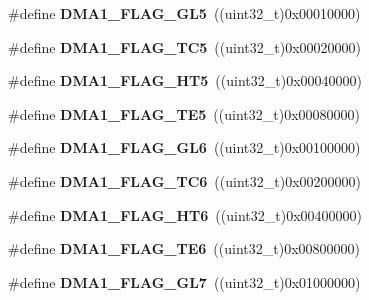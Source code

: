 \begin{DoxyCompactItemize}
\item 
\hypertarget{group__DMA__flags__definition_ga173d8dadcbf3d96911a43eedf53bd64e}{
\#define {\bfseries DMA1\_\-FLAG\_\-GL5}~((uint32\_\-t)0x00010000)}
\label{group__DMA__flags__definition_ga173d8dadcbf3d96911a43eedf53bd64e}

\item 
\hypertarget{group__DMA__flags__definition_ga438d3577b5b5b6c2c0cf1008296c23bb}{
\#define {\bfseries DMA1\_\-FLAG\_\-TC5}~((uint32\_\-t)0x00020000)}
\label{group__DMA__flags__definition_ga438d3577b5b5b6c2c0cf1008296c23bb}

\item 
\hypertarget{group__DMA__flags__definition_ga648a2eb0b008ab009f03d207596c3cd7}{
\#define {\bfseries DMA1\_\-FLAG\_\-HT5}~((uint32\_\-t)0x00040000)}
\label{group__DMA__flags__definition_ga648a2eb0b008ab009f03d207596c3cd7}

\item 
\hypertarget{group__DMA__flags__definition_ga17b9793d2f78c683f7c48ba4f7fa2e70}{
\#define {\bfseries DMA1\_\-FLAG\_\-TE5}~((uint32\_\-t)0x00080000)}
\label{group__DMA__flags__definition_ga17b9793d2f78c683f7c48ba4f7fa2e70}

\item 
\hypertarget{group__DMA__flags__definition_gab21d0196f89435f61bedd03d53edc093}{
\#define {\bfseries DMA1\_\-FLAG\_\-GL6}~((uint32\_\-t)0x00100000)}
\label{group__DMA__flags__definition_gab21d0196f89435f61bedd03d53edc093}

\item 
\hypertarget{group__DMA__flags__definition_ga85276600ddf436d4f268199e0df9c54a}{
\#define {\bfseries DMA1\_\-FLAG\_\-TC6}~((uint32\_\-t)0x00200000)}
\label{group__DMA__flags__definition_ga85276600ddf436d4f268199e0df9c54a}

\item 
\hypertarget{group__DMA__flags__definition_ga0d594cb12f86f19c9562d82c3ca505bc}{
\#define {\bfseries DMA1\_\-FLAG\_\-HT6}~((uint32\_\-t)0x00400000)}
\label{group__DMA__flags__definition_ga0d594cb12f86f19c9562d82c3ca505bc}

\item 
\hypertarget{group__DMA__flags__definition_ga231e156a0e27f7b2271ea44ca90c237d}{
\#define {\bfseries DMA1\_\-FLAG\_\-TE6}~((uint32\_\-t)0x00800000)}
\label{group__DMA__flags__definition_ga231e156a0e27f7b2271ea44ca90c237d}

\item 
\hypertarget{group__DMA__flags__definition_ga37e5e27ca5bf6f3211d2effda2ca7646}{
\#define {\bfseries DMA1\_\-FLAG\_\-GL7}~((uint32\_\-t)0x01000000)}
\label{group__DMA__flags__definition_ga37e5e27ca5bf6f3211d2effda2ca7646}


\end{DoxyCompactItemize}
